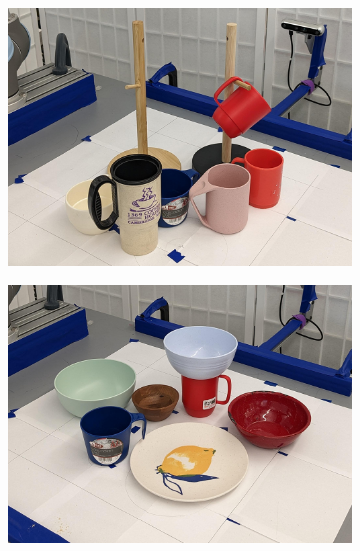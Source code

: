 \documentclass{article}
\begin{document}
\begin{figure}[]
    \centering

    \begin{subfigure}{(\linewidth - 0.05\linewidth)/3}
        \centering
        \includegraphics[width=\linewidth]{figures/object_sets/mug_on_tree.png}
        \caption{}
    \end{subfigure}
    \begin{subfigure}{(\linewidth - 0.05\linewidth)/3}
        \centering
        \includegraphics[width=\linewidth]{figures/object_sets/bowl_on_mug.png}
        \caption{}
    \end{subfigure}
    \begin{subfigure}{(\linewidth - 0.05\linewidth)/3}

\end{subfigure}
\end{figure}
\end{document}

